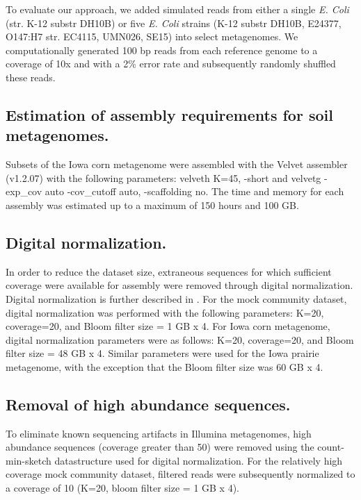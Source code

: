 \documentclass{pnastwo}
\begin{document}
\begin{article}
To evaluate our approach, we added simulated reads from either a
single \emph{E. Coli} (str. K-12 substr DH10B) or five \emph{E. Coli} strains (K-12
substr DH10B, E24377, O147:H7 str. EC4115, UMN026, SE15) into select
metagenomes.  We computationally generated 100 bp reads from each
reference genome to a coverage of 10x and with a 2\% error rate and
subsequently randomly shuffled these reads.

\subsection*{Estimation of assembly requirements for soil metagenomes.}
Subsets of the Iowa corn metagenome were assembled with the Velvet
assembler (v1.2.07) with the following parameters: velveth K=45,
-short and velvetg -exp\_cov auto -cov\_cutoff auto, -scaffolding no.
The time and memory for each assembly was estimated up to a maximum of
150 hours and 100 GB.

\subsection*{Digital normalization.}
In order to reduce the dataset size, extraneous sequences for which sufficient coverage were available for assembly  were removed through digital normalization.  Digital normalization is further described in \cite{browndiginorm}.  
For the mock community dataset, digital normalization was performed with the
following parameters: K=20, coverage=20, and Bloom filter size = 1 GB
x 4.  For Iowa corn metagenome, digital normalization parameters were
as follows: K=20, coverage=20, and Bloom filter size = 48 GB x 4.
Similar parameters were used for the Iowa prairie metagenome, with the
exception that the Bloom filter size was 60 GB x 4.

\subsection*{Removal of high abundance sequences.}
To eliminate known sequencing artifacts in Illumina metagenomes, high abundance 
sequences (coverage
greater than 50) were removed using the count-min-sketch datastructure
used for digital normalization.  For the relatively high coverage mock
community dataset, filtered reads were subsequently normalized to a
coverage of 10 (K=20, bloom filter size = 1 GB x 4).


\end{article}
\end{document}
